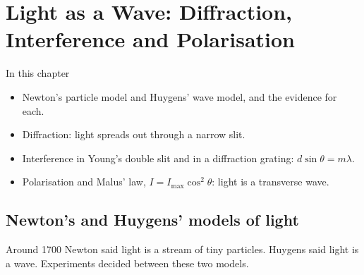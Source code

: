 \chapter{Light as a Wave: Diffraction, Interference and Polarisation}\label{ch2:chap}

\begin{summarybox}{In this chapter}
\begin{itemize}
  \item Newton's particle model and Huygens' wave model, and the evidence for each.
  \item Diffraction: light spreads out through a narrow slit.
  \item Interference in Young's double slit and in a diffraction grating: $d\sin\theta = m\lambda$.
  \item Polarisation and Malus' law, $I = I_\mathrm{max}\cos^2\theta$: light is a transverse wave.
\end{itemize}
\end{summarybox}

\section{Newton's and Huygens' models of light}\label{ch2:sec:models}

\begin{bigidea}
Around 1700 Newton said light is a stream of tiny particles. Huygens said light is a
wave. Experiments decided between these two models.
\end{bigidea}

\begin{keywords}
\end{keywords}

